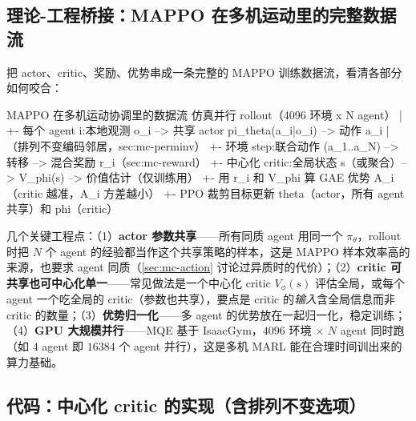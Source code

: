 \subsection{理论-工程桥接：MAPPO 在多机运动里的完整数据流}
\label{sec:mc-mappo-flow}

把 actor、critic、奖励、优势串成一条完整的 MAPPO 训练数据流，看清各部分如何咬合：

\begin{codebox}[text]{MAPPO 在多机运动协调里的数据流}
仿真并行 rollout（4096 环境 x N agent）
   |
   +- 每个 agent i:本地观测 o_i --> 共享 actor pi_theta(a_i|o_i) --> 动作 a_i
   |                                  （排列不变编码邻居，sec:mc-perminv）
   +- 环境 step:联合动作 (a_1..a_N) --> 转移 --> 混合奖励 r_i（sec:mc-reward）
   +- 中心化 critic:全局状态 s（或聚合）--> V_phi(s) --> 价值估计（仅训练用）
   +- 用 r_i 和 V_phi 算 GAE 优势 A_i（critic 越准，A_i 方差越小）
   +- PPO 裁剪目标更新 theta（actor，所有 agent 共享）和 phi（critic）
\end{codebox}

\noindent 几个关键工程点：（1）\textbf{actor 参数共享}——所有同质 agent 用同一个 $\pi_\theta$，rollout 时把 $N$ 个 agent 的经验都当作这个共享策略的样本，这是 MAPPO 样本效率高的来源，也要求 agent 同质（\cref{sec:mc-action} 讨论过异质时的代价）；（2）\textbf{critic 可共享也可中心化单一}——常见做法是一个中心化 critic $V_\phi(s)$ 评估全局，或每个 agent 一个吃全局的 critic（参数也共享），要点是 critic 的\emph{输入}含全局信息而非 critic 的数量；（3）\textbf{优势归一化}——多 agent 的优势放在一起归一化，稳定训练；（4）\textbf{GPU 大规模并行}——MQE 基于 IsaacGym\cite{xiong2024mqe}，$4096$ 环境 $\times$ $N$ agent 同时跑（如 $4$ agent 即 $16384$ 个 agent 并行），这是多机 MARL 能在合理时间训出来的算力基础。

\subsection{代码：中心化 critic 的实现（含排列不变选项）}
\label{sec:mc-ctde-code}


